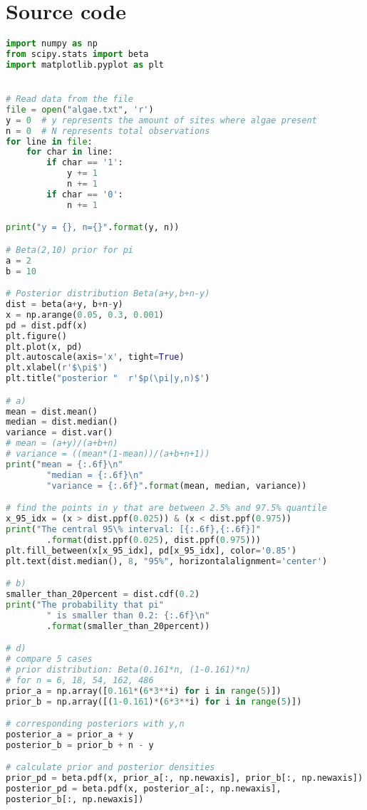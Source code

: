 \documentclass[article,11pt]{article}
\begin{document}
\section* {{\large Source code}}
\begin{lstlisting}[language=python]
import numpy as np
from scipy.stats import beta
import matplotlib.pyplot as plt


# Read data from the file
file = open("algae.txt", 'r')
y = 0  # y represents the amount of sites where algae present
n = 0  # N represents total observations
for line in file:
	for char in line:
		if char == '1':
			y += 1
			n += 1
		if char == '0':
			n += 1

print("y = {}, n={}".format(y, n))

# Beta(2,10) prior for pi
a = 2
b = 10

# Posterior distribution Beta(a+y,b+n-y)
dist = beta(a+y, b+n-y)
x = np.arange(0.05, 0.3, 0.001)
pd = dist.pdf(x)
plt.figure()
plt.plot(x, pd)
plt.autoscale(axis='x', tight=True)
plt.xlabel(r'$\pi$')
plt.title("posterior "  r'$p(\pi|y,n)$')

# a)
mean = dist.mean()
median = dist.median()
variance = dist.var()
# mean = (a+y)/(a+b+n)
# variance = ((mean*(1-mean))/(a+b+n+1))
print("mean = {:.6f}\n"
		"median = {:.6f}\n"
		"variance = {:.6f}".format(mean, median, variance))

# find the points in y that are between 2.5% and 97.5% quantile
x_95_idx = (x > dist.ppf(0.025)) & (x < dist.ppf(0.975))
print("The central 95\% interval: [{:.6f},{:.6f}]"
		.format(dist.ppf(0.025), dist.ppf(0.975)))
plt.fill_between(x[x_95_idx], pd[x_95_idx], color='0.85')
plt.text(dist.median(), 8, "95%", horizontalalignment='center')

# b)
smaller_than_20percent = dist.cdf(0.2)
print("The probability that pi"
		" is smaller than 0.2: {:.6f}\n"
		.format(smaller_than_20percent))

# d)
# compare 5 cases
# prior distribution: Beta(0.161*n, (1-0.161)*n)
# for n = 6, 18, 54, 162, 486
prior_a = np.array([0.161*(6*3**i) for i in range(5)])
prior_b = np.array([(1-0.161)*(6*3**i) for i in range(5)])

# corresponding posteriors with y,n
posterior_a = prior_a + y
posterior_b = prior_b + n - y

# calculate prior and posterior densities
prior_pd = beta.pdf(x, prior_a[:, np.newaxis], prior_b[:, np.newaxis])
posterior_pd = beta.pdf(x, posterior_a[:, np.newaxis],
posterior_b[:, np.newaxis])


\end{lstlisting}
\end{document}
